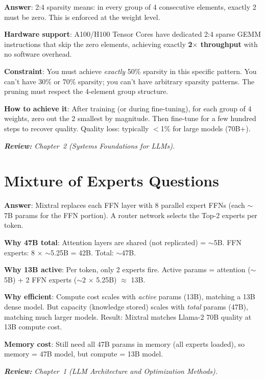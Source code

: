 \begin{questionbox}
\textbf{Answer}: 2:4 sparsity means: in every group of 4 consecutive elements, exactly 2 must be zero. This is enforced at the weight level.

\textbf{Hardware support}: A100/H100 Tensor Cores have dedicated 2:4 sparse GEMM instructions that skip the zero elements, achieving exactly \textbf{2$\times$ throughput} with no software overhead.

\textbf{Constraint}: You must achieve \emph{exactly} 50\% sparsity in this specific pattern. You can’t have 30\% or 70\% sparsity; you can’t have arbitrary sparsity patterns. The pruning must respect the 4-element group structure.

\textbf{How to achieve it}: After training (or during fine-tuning), for each group of 4 weights, zero out the 2 smallest by magnitude. Then fine-tune for a few hundred steps to recover quality. Quality loss: typically $<$1\% for large models (70B+).

\emph{\textbf{Review:} Chapter~2 (Systems Foundations for LLMs).}
\end{questionbox}

\section{Mixture of Experts Questions}
\label{mixture-of-experts-questions}

\begin{questionbox}
\textbf{Answer}: Mixtral replaces each FFN layer with 8 parallel expert FFNs (each $\sim$7B params for the FFN portion). A router network selects the Top-2 experts per token.

\textbf{Why 47B total}: Attention layers are shared (not replicated) = $\sim$5B. FFN experts: 8 $\times$ $\sim$5.25B = 42B. Total: $\sim$47B.

\textbf{Why 13B active}: Per token, only 2 experts fire. Active params = attention ($\sim$5B) + 2 FFN experts ($\sim$2 $\times$ 5.25B) $\approx$ 13B.

\textbf{Why efficient}: Compute cost scales with \emph{active} params (13B), matching a 13B dense model. But capacity (knowledge stored) scales with \emph{total} params (47B), matching much larger models. Result: Mixtral matches Llama-2 70B quality at 13B compute cost.

\textbf{Memory cost}: Still need all 47B params in memory (all experts loaded), so memory = 47B model, but compute = 13B model.

\emph{\textbf{Review:} Chapter~1 (LLM Architecture and Optimization Methods).}
\end{questionbox}

